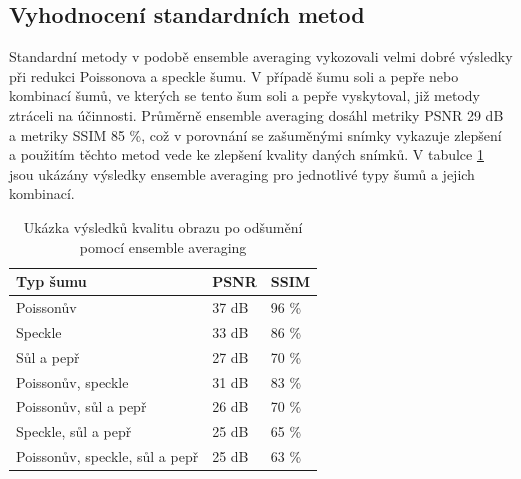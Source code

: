 \documentclass[male,czech,api_ing]{thesis}
\begin{document}
\subsection{Vyhodnocení standardních metod}
Standardní metody v podobě ensemble averaging vykozovali velmi dobré výsledky při redukci Poissonova a speckle šumu. V případě šumu soli a pepře nebo kombinací šumů, ve kterých se tento šum soli a pepře vyskytoval, již metody ztráceli na účinnosti. Průměrně ensemble averaging dosáhl metriky PSNR 29 dB a metriky SSIM 85 \%, což v porovnání se zašuměnými snímky vykazuje zlepšení a použitím těchto metod vede ke zlepšení kvality daných snímků. V tabulce \ref{tab:EnsembleResults} jsou ukázány výsledky ensemble averaging pro jednotlivé typy šumů a jejich kombinací.

\begin{table}[h]
    \centering
    \begin{tabular}{|l|l|l|}
    \hline
    \textbf{Typ šumu}               & \textbf{PSNR} & \textbf{SSIM} \\ \hline
    Poissonův                       & 37 dB         &  96 \%        \\ \hline
    Speckle                         & 33 dB         &  86 \%        \\ \hline
    Sůl a pepř                      & 27 dB         &  70 \%        \\ \hline
    Poissonův, speckle              & 31 dB         &  83 \%        \\ \hline
    Poissonův, sůl a pepř           & 26 dB         &  70 \%        \\ \hline
    Speckle, sůl a pepř             & 25 dB         &  65 \%        \\ \hline
    Poissonův, speckle, sůl a pepř  & 25 dB         &  63 \%        \\ \hline
    \end{tabular}
    \caption{Ukázka výsledků kvalitu obrazu po odšumění pomocí ensemble averaging}
    \label{tab:EnsembleResults}
\end{table}
\end{document}
